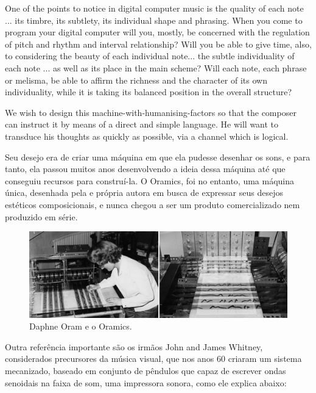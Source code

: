 \begin{citacao}
One of the points to notice in digital computer music is the
quality of each note ... its timbre, its subtlety, its individual shape and phrasing. When you come to program your digital computer will you, mostly, be concerned with the regulation of pitch and rhythm and interval relationship? Will you be able to give time, also, to considering the beauty of each individual note... the subtle individuality of each note ... as well as its place in the main scheme? Will each note, each phrase or melisma, be able to affirm the richness and the character of its own individuality, while it is taking its balanced position in the overall structure? 

We wish to design this machine-with-humanising-factors so that the composer can instruct it by means of a direct and simple language. He will want to transduce his thoughts as quickly as possible, via a channel which is logical. \cite[97]{Oram1972}
\end{citacao}

Seu desejo era de criar uma máquina em que ela pudesse desenhar os sons, e para tanto, ela passou muitos anos desenvolvendo a ideia dessa máquina até que conseguiu recursos para construí-la. O Oramics, foi no entanto, uma máquina única, desenhada pela e própria autora em busca de expressar seus desejos estéticos composicionais, e nunca chegou a ser um produto comercializado nem produzido em série.   

\begin{figure}[ht]
    \caption{\label{oram}Daphne Oram e o Oramics.}
    \begin{center}
        \includegraphics[width=1\linewidth]{pictures/cap2/oramics}
    \end{center}
\end{figure}


Outra referência importante são os irmãos John and James Whitney, considerados precursores da música visual, que nos anos 60 criaram um sistema mecanizado, baseado em conjunto de pêndulos que capaz de escrever ondas senoidais na faixa de som, uma impressora sonora, como ele explica abaixo:

